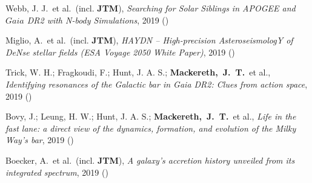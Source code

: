 \item[{\scriptsize5}]Webb, J. J.~et al.~(incl. \textbf{JTM}), \textit{Searching for Solar Siblings in APOGEE and $Gaia$ DR2 with N-body Simulations}, 2019 ()

\item[{\scriptsize4}]Miglio, A.~et al.~(incl. \textbf{JTM}), \textit{HAYDN -- High-precision AsteroseismologY of DeNse stellar fields (ESA Voyage 2050 White Paper)}, 2019 ()

\item[{\scriptsize3}]Trick, W. H.; Fragkoudi, F.; Hunt, J. A. S.; \textbf{Mackereth,~J.~T.}~et al., \textit{Identifying resonances of the Galactic bar in Gaia DR2: Clues from action space}, 2019 ()

\item[{\scriptsize2}]Bovy, J.; Leung, H. W.; Hunt, J. A. S.; \textbf{Mackereth,~J.~T.}~et al., \textit{Life in the fast lane: a direct view of the dynamics, formation, and evolution of the Milky Way's bar}, 2019 ()

\item[{\scriptsize1}]Boecker, A.~et al.~(incl. \textbf{JTM}), \textit{A galaxy's accretion history unveiled from its integrated spectrum}, 2019 ()